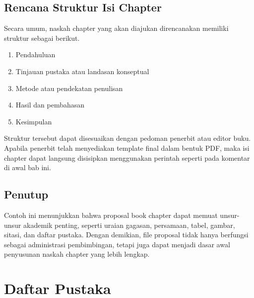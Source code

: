 \documentclass[proposal-bookchapter]{unnes-ta_plus}
\begin{document}
\section{Rencana Struktur Isi Chapter}
Secara umum, naskah chapter yang akan diajukan direncanakan memiliki struktur sebagai berikut.
\begin{enumerate}
    \item Pendahuluan
    \item Tinjauan pustaka atau landasan konseptual
    \item Metode atau pendekatan penulisan
    \item Hasil dan pembahasan
    \item Kesimpulan
\end{enumerate}

Struktur tersebut dapat disesuaikan dengan pedoman penerbit atau editor buku. Apabila penerbit telah menyediakan template final dalam bentuk PDF, maka isi chapter dapat langsung disisipkan menggunakan perintah \verb|| seperti pada komentar di awal bab ini.

\section{Penutup}
Contoh ini menunjukkan bahwa proposal book chapter dapat memuat unsur-unsur akademik penting, seperti uraian gagasan, persamaan, tabel, gambar, sitasi, dan daftar pustaka. Dengan demikian, file proposal tidak hanya berfungsi sebagai administrasi pembimbingan, tetapi juga dapat menjadi dasar awal penyusunan naskah chapter yang lebih lengkap.

\chapter*{Daftar Pustaka}
\printbibliography[heading=none]
\end{document}
